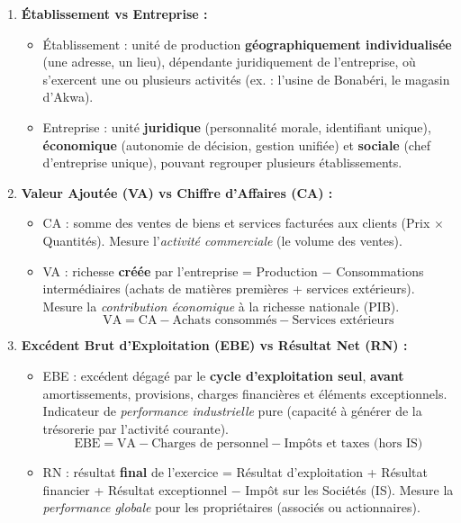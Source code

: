 \documentclass[11pt]{article}
\newcommand{\cle}[1]{{\popxbold\color{popdark}#1}}
\begin{document}
\begin{corrige}
\begin{enumerate}
    \item \textbf{Établissement vs Entreprise :}
    \begin{itemize}
        \item \cle{Établissement} : unité de production \textbf{géographiquement individualisée} (une adresse, un lieu), dépendante juridiquement de l'entreprise, où s'exercent une ou plusieurs activités (ex. : l'usine de Bonabéri, le magasin d'Akwa).
        \item \cle{Entreprise} : unité \textbf{juridique} (personnalité morale, identifiant unique), \textbf{économique} (autonomie de décision, gestion unifiée) et \textbf{sociale} (chef d'entreprise unique), pouvant regrouper plusieurs établissements.
    \end{itemize}
    \item \textbf{Valeur Ajoutée (VA) vs Chiffre d'Affaires (CA) :}
    \begin{itemize}
        \item \cle{CA} : somme des ventes de biens et services facturées aux clients (Prix $\times$ Quantités). Mesure l'\emph{activité commerciale} (le volume des ventes).
        \item \cle{VA} : richesse \textbf{créée} par l'entreprise = Production $-$ Consommations intermédiaires (achats de matières premières + services extérieurs). Mesure la \emph{contribution économique} à la richesse nationale (PIB).
        \[ \text{VA} = \text{CA} - \text{Achats consommés} - \text{Services extérieurs} \]
    \end{itemize}
    \item \textbf{Excédent Brut d'Exploitation (EBE) vs Résultat Net (RN) :}
    \begin{itemize}
        \item \cle{EBE} : excédent dégagé par le \textbf{cycle d'exploitation seul}, \textbf{avant} amortissements, provisions, charges financières et éléments exceptionnels. Indicateur de \emph{performance industrielle} pure (capacité à générer de la trésorerie par l'activité courante).
        \[ \text{EBE} = \text{VA} - \text{Charges de personnel} - \text{Impôts et taxes (hors IS)} \]
        \item \cle{RN} : résultat \textbf{final} de l'exercice = Résultat d'exploitation + Résultat financier + Résultat exceptionnel $-$ Impôt sur les Sociétés (IS). Mesure la \emph{performance globale} pour les propriétaires (associés ou actionnaires).

\end{itemize}
\end{enumerate}
\end{corrige}
\end{document}
